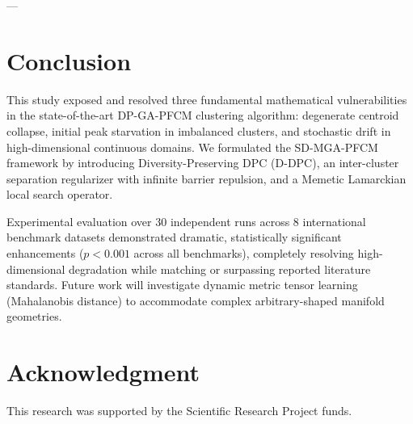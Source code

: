 \documentclass[preprint,12pt]{elsarticle}
\begin{document}
---

\section{Conclusion}
\label{sec:conclusion}
This study exposed and resolved three fundamental mathematical vulnerabilities in the state-of-the-art DP-GA-PFCM clustering algorithm: degenerate centroid collapse, initial peak starvation in imbalanced clusters, and stochastic drift in high-dimensional continuous domains. We formulated the SD-MGA-PFCM framework by introducing Diversity-Preserving DPC (D-DPC), an inter-cluster separation regularizer with infinite barrier repulsion, and a Memetic Lamarckian local search operator. 

Experimental evaluation over 30 independent runs across 8 international benchmark datasets demonstrated dramatic, statistically significant enhancements ($p < 0.001$ across all benchmarks), completely resolving high-dimensional degradation while matching or surpassing reported literature standards. Future work will investigate dynamic metric tensor learning (Mahalanobis distance) to accommodate complex arbitrary-shaped manifold geometries.

\section*{Acknowledgment}
This research was supported by the Scientific Research Project funds.



\end{document}
